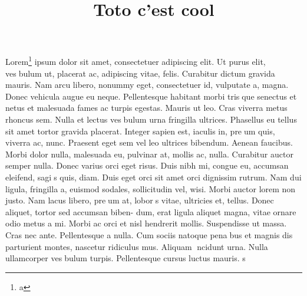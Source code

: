 \documentclass{plasci-secastro}
\title{Toto c'est cool}
\begin{document}
Lorem\footnote{a} ipsum dolor sit amet, consectetuer adipiscing elit. Ut purus elit, ves􏰔bulum ut, placerat ac, adipiscing vitae, felis. Curabitur dictum gravida mauris. Nam arcu libero, nonummy eget, consectetuer id, vulputate a, magna. Donec vehicula augue eu neque. Pellentesque habitant morbi tris􏰔que senectus et netus et malesuada fames ac turpis egestas. Mauris ut leo. Cras viverra metus rhoncus sem. Nulla et lectus ves􏰔bulum urna fringilla ultrices. Phasellus eu tellus sit amet tortor gravida placerat. Integer sapien est, iaculis in, pre􏰔um quis, viverra ac, nunc. Praesent eget sem vel leo ultrices bibendum. Aenean faucibus. Morbi dolor nulla, malesuada eu, pulvinar at, mollis ac, nulla. Curabitur auctor semper nulla. Donec varius orci eget risus. Duis nibh mi, congue eu, accumsan eleifend, sagi􏰕s quis, diam. Duis eget orci sit amet orci dignissim rutrum.
Nam dui ligula, fringilla a, euismod sodales, sollicitudin vel, wisi. Morbi auctor lorem non justo. Nam lacus libero, pre􏰔um at, lobor􏰔s vitae, ultricies et, tellus. Donec aliquet, tortor sed accumsan biben- dum, erat ligula aliquet magna, vitae ornare odio metus a mi. Morbi ac orci et nisl hendrerit mollis. Suspendisse ut massa. Cras nec ante. Pellentesque a nulla. Cum sociis natoque pena􏰔bus et magnis dis parturient montes, nascetur ridiculus mus. Aliquam 􏰔ncidunt urna. Nulla ullamcorper ves􏰔bulum turpis. Pellentesque cursus luctus mauris.
\newpage
s
\end{document}
